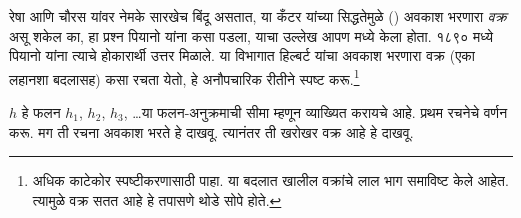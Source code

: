 \documentclass[../../../include/open-logic-section]{subfiles}
\begin{document}


रेषा आणि चौरस यांवर नेमके सारखेच बिंदू असतात, या कँटर यांच्या सिद्धतेमुळे () अवकाश भरणारा \emph{वक्र} असू शकेल का, हा प्रश्न पियानो यांना कसा पडला, याचा उल्लेख आपण  मध्ये केला होता. १८९० मध्ये पियानो यांना त्याचे होकारार्थी उत्तर मिळाले. या विभागात हिल्बर्ट यांचा अवकाश भरणारा वक्र (एका लहानशा बदलासह) कसा रचता येतो, हे अनौपचारिक रीतीने स्पष्ट करू.\footnote{अधिक काटेकोर स्पष्टीकरणासाठी \cite{Rose2010} पाहा. या बदलात खालील वक्रांचे लाल भाग समाविष्ट केले आहेत. त्यामुळे वक्र सतत आहे हे तपासणे थोडे सोपे होते.}

$h$ हे फलन $h_1$, $h_2$, $h_3$, \dots\@ या फलन-अनुक्रमाची सीमा म्हणून व्याख्यित करायचे आहे. प्रथम रचनेचे वर्णन करू. मग ती रचना अवकाश भरते हे दाखवू. त्यानंतर ती खरोखर वक्र आहे हे दाखवू.
\end{document}
